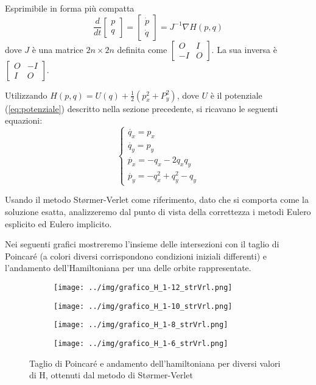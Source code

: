 \documentclass[a4paper]{article}
\numberwithin{equation}{section}
\numberwithin{figure}{section}
\begin{document}
Esprimibile in forma più compatta
\begin{equation}
	\frac{d}{dt}
	\begin{bmatrix}
		p\\q
	\end{bmatrix} =
	\begin{bmatrix}
		\dot{p}\\\dot{q}
	\end{bmatrix} = 
	J^{-1}\nabla H(p,q)
\end{equation}
dove $J$ è una matrice $2n\times 2n$ definita come $\begin{bmatrix}
O&I\\-I&O \end{bmatrix}$. La sua inversa è $\begin{bmatrix}
O&-I\\I&O \end{bmatrix}$.

Utilizzando $H(p,q) = U(q)+\frac{1}{2}(p_x^2+P_y^2)$, dove $U$ è il potenziale (\ref{eq:potenziale})
descritto nella sezione precedente, si ricavano le
seguenti equazioni:
$$
\begin{cases}
	\dot{q_x} = p_x\\
	\dot{q_y} = p_y\\
	\dot{p_x} = -q_x-2q_x q_y\\
	\dot{p_y} = -q_x^2 + q_y^2 - q_y
\end{cases}
$$

Usando il metodo Størmer-Verlet come riferimento, dato che si comporta come la soluzione
esatta\cite{hairer}, analizzeremo dal punto di vista della correttezza i metodi Eulero esplicito
ed Eulero implicito.

Nei seguenti grafici mostreremo l'insieme delle intersezioni con il taglio di Poincaré (a colori
diversi corrispondono condizioni iniziali differenti) e l'andamento dell'Hamiltoniana per una delle
orbite rappresentate.

\begin{figure}[h!]
	\centering
	\begin{subfigure}[t]{.49\textwidth}
		\centering
		\texttt{[image: ../img/grafico\_H\_1-12\_strVrl.png]}
	\end{subfigure}
	\begin{subfigure}[t]{.49\textwidth}
		\centering
		\texttt{[image: ../img/grafico\_H\_1-10\_strVrl.png]}
	\end{subfigure}
	\begin{subfigure}[t]{.49\textwidth}
		\centering
		\texttt{[image: ../img/grafico\_H\_1-8\_strVrl.png]}
	\end{subfigure}
	\begin{subfigure}[t]{.49\textwidth}
		\centering
		\texttt{[image: ../img/grafico\_H\_1-6\_strVrl.png]}
	\end{subfigure}

	\caption{Taglio di Poincaré e andamento dell'hamiltoniana per diversi valori di H,
	ottenuti dal metodo di Størmer-Verlet}
\end{figure}



\clearpage
\printbibliography
\end{document}
